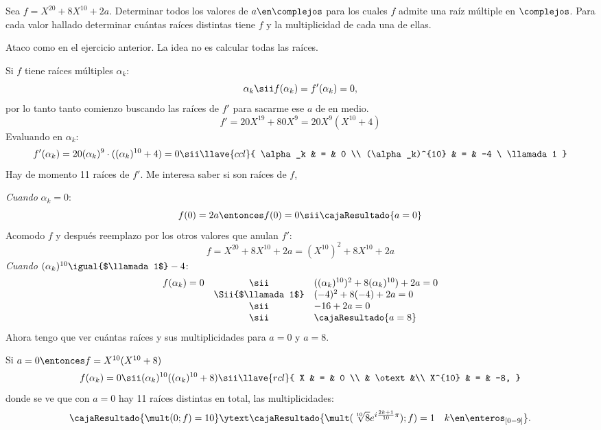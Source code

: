 \begin{enunciado}{\ejercicio}
	Sea $f = X^{20} + 8X^{10} + 2a$. Determinar todos los valores de
	$a \en \complejos$ para los cuales $f$ admite una raíz múltiple en
	$\complejos$. Para cada valor hallado determinar cuántas raíces
	distintas tiene $f$ y la multiplicidad de cada una de ellas.
\end{enunciado}
Ataco como en el ejercicio anterior. La idea no es calcular todas las raíces.

Si $f$ tiene raíces múltiples $\alpha_k$:
$$
	\alpha_k
	\sii
	f(\alpha_k) = f'(\alpha_k) =  0,
$$
por lo tanto  tanto comienzo buscando las raíces de $f'$ para sacarme ese $a$ de en medio.
$$
	f' = 20X^{19} + 80 X^9 =
	20 X^9 (X^{10} + 4)
$$
Evaluando en $\alpha_k$:
$$
	f'(\alpha_k) =
	20 (\alpha_k)^9 \cdot ((\alpha_k)^{10} + 4)=
	0
	\sii
	\llave{ccl}{
		\alpha_k & = & 0 \\
		(\alpha_k)^{10}  & = & -4 \ \llamada1
	}
$$
Hay de momento 11 raíces de $f'$. Me interesa saber si son raíces de $f$,

\textit{Cuando} $\alpha_k = 0$:
$$
	f(0) = 2a
	\entonces
	f(0) = 0
	\sii
	\cajaResultado{
		a = 0
	}
$$
Acomodo $f$ y después reemplazo por los otros valores que anulan $f'$:
$$
	f =
	X^{20} + 8X^{10} + 2a =
	(X^{10})^2 + 8X^{10} + 2a
$$
\textit{Cuando} $(\alpha_k)^{10} \igual{$\llamada1$} -4$:
$$
	\begin{array}{rcl}
		f(\alpha_k) = 0
		 & \sii              &
		((\alpha_k)^{10})^2 + 8(\alpha_k)^{10}) + 2a = 0 \\
		 & \Sii{$\llamada1$} &
		(-4)^2 + 8(-4) + 2a = 0                          \\
		 & \sii              &
		-16 + 2a = 0                                     \\
		 & \sii              &
		\cajaResultado{
			a = 8
		}
	\end{array}
$$
Ahora tengo que ver cuántas raíces y sus multiplicidades para $a = 0$ y $a = 8$.

Si $a = 0 \entonces f = X^{10}(X^{10} + 8)$
$$
	f(\alpha_k) = 0
	\sii
	(\alpha_k)^{10}((\alpha_k)^{10} + 8)
	\sii
	\llave{rcl}{
		X & = & 0 \\
		& \otext &\\
		X^{10} & = & -8,
	}
$$
donde se ve que con $a = 0$ hay 11 raíces distintas en total, las multiplicidades:
$$
	\cajaResultado{\mult(0;f) = 10}
	\ytext
	\cajaResultado{\mult(\sqrt[10]{8}e^{i\frac{2k+1}{10}\pi});f) = 1 \quad k \en \enteros_{[0-9]}}.
$$


